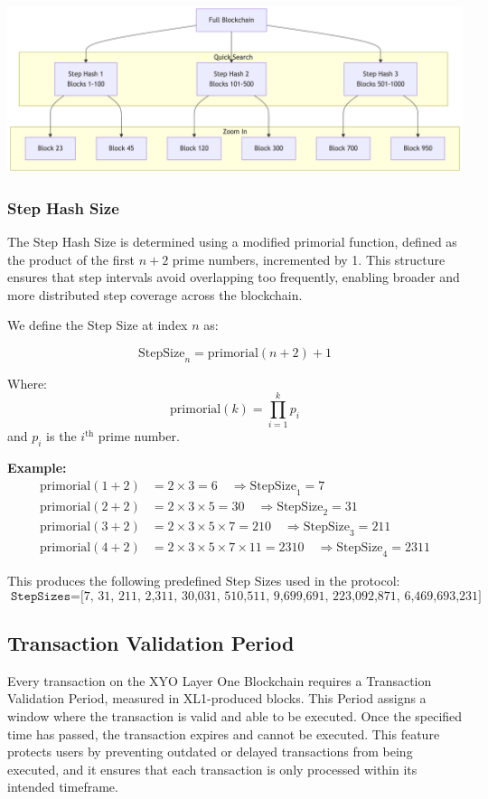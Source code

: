 \documentclass{article}
\begin{document}
\begin{center}
    \includegraphics[width=15cm]{step-hash.png}
\end{center}

\subsubsection{Step Hash Size}

The Step Hash Size is determined using a modified primorial function, defined
as the product of the first \(n+2\) prime numbers, incremented by 1. This
structure ensures that step intervals avoid overlapping too frequently,
enabling broader and more distributed step coverage across the blockchain.

We define the Step Size at index \(n\) as:

\[
    \text{StepSize}_n = \text{primorial}(n+2) + 1
\]

Where:
\[
    \text{primorial}(k) = \prod_{i=1}^{k} p_i
\]
and \(p_i\) is the \(i^\text{th}\) prime number.

\textbf{Example:}
\begin{align*}
    \text{primorial}(1+2) & = 2 \times 3 = 6 \quad \Rightarrow \text{StepSize}_1 = 7                                   \\
    \text{primorial}(2+2) & = 2 \times 3 \times 5 = 30 \quad \Rightarrow \text{StepSize}_2 = 31                        \\
    \text{primorial}(3+2) & = 2 \times 3 \times 5 \times 7 = 210 \quad \Rightarrow \text{StepSize}_3 = 211             \\
    \text{primorial}(4+2) & = 2 \times 3 \times 5 \times 7 \times 11 = 2310 \quad \Rightarrow \text{StepSize}_4 = 2311
\end{align*}

This produces the following predefined Step Sizes used in the protocol:
\[
    \texttt{StepSizes} = \text{[7, 31, 211, 2,311, 30,031, 510,511, 9,699,691, 223,092,871, 6,469,693,231]}
\]

\subsection{Transaction Validation Period}
Every transaction on the XYO Layer One Blockchain requires a Transaction
Validation Period, measured in XL1-produced blocks. This Period assigns a
window where the transaction is valid and able to be executed. Once the
specified time has passed, the transaction expires and cannot be executed. This
feature protects users by preventing outdated or delayed transactions from
being executed, and it ensures that each transaction is only processed within
its intended timeframe.
\end{document}

